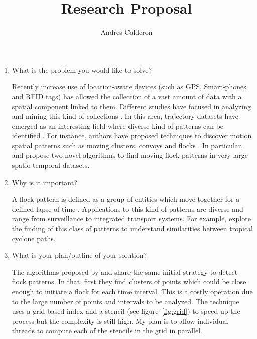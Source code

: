 \documentclass[a4paper, 12pt]{scrartcl}
\title{Research Proposal}
\author{Andres Calderon}
\begin{document}
\maketitle

\begin{enumerate}
 \item What is the problem you would like to solve?
 
Recently increase use of location-aware devices (such as GPS, Smart-phones and RFID tags) has allowed the collection of a vast amount of data with a spatial component linked to them.  Different studies have focused in analyzing and mining this kind of collections \citep{leung_knowledge_2010}\citep{Miller_2001}.  In this area, trajectory datasets have emerged as an interesting field where diverse kind of patterns can be identified \citep{zheng_computing_2011}\citep{vieira_spatio-temporal_2013}.  For instance, authors have proposed techniques to discover motion spatial patterns such as moving clusters\citep{kalnis_discovering_2005}, convoys\citep{jeung_discovery_2008} and flocks \citep{benkert_reporting_2006}\citep{gudmundsson_computing_2006}.  In particular, \citep{vieira_-line_2009} and \citep{turdukulov_visual_2014} propose two novel algorithms to find moving flock patterns in very large spatio-temporal datasets.
 
 \item Why is it important?
 
A flock pattern is defined as a group of entities which move together for a defined lapse of time \citep{benkert_reporting_2006}.  Applications to this kind of patterns are diverse and range from surveillance to integrated transport systems.  For example, \citep{turdukulov_visual_2014} explore the finding of this class of patterns to understand similarities between tropical cyclone paths.  
 
 \item What is your plan/outline of your solution?
 
The algorithms proposed by \citep{vieira_-line_2009} and \citep{turdukulov_visual_2014} share the same initial strategy to detect flock patterns.  In that, first they find clusters of points which could be close enough to initiate a flock for each time interval.  This is a costly operation due to the large number of points and intervals to be analyzed.  The technique uses a grid-based index and a stencil (see figure~\ref{fig:grid}) to speed up the process but the complexity is still high.  My plan is to allow  individual threads to compute each of the stencils in the grid in parallel.


\end{enumerate}
\end{document}
